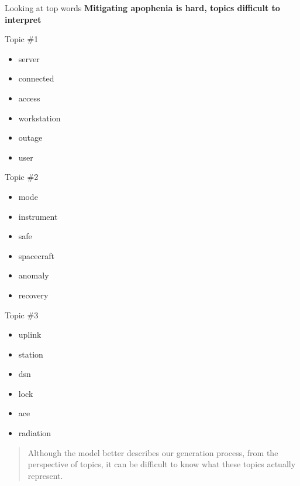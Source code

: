 \documentclass[10pt]{beamer}
\begin{document}
\begin{frame}{Looking at top words}
  {\bf Mitigating apophenia is hard, topics difficult to interpret}

  \begin{multicols}{3}
    Topic \#1
    \begin{itemize}
    \item server
    \item connected
    \item access
    \item workstation
    \item outage
    \item user
    \end{itemize}

    \columnbreak

    Topic \#2
    \begin{itemize}
    \item mode
    \item instrument
    \item safe
    \item spacecraft
    \item anomaly
    \item recovery
    \end{itemize}

    \columnbreak

    Topic \#3
    \begin{itemize}
    \item uplink
    \item station
    \item dsn
    \item lock
    \item ace
    \item radiation
    \end{itemize}

  \end{multicols}

  \begin{quote}
    Although the model better describes our generation process, from the perspective of topics, it can be difficult to know what these topics actually represent.
  \end{quote}
\end{frame}
\end{document}
